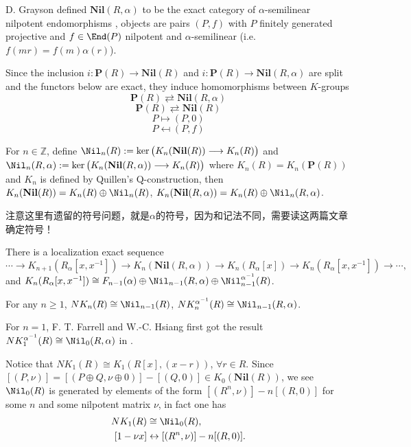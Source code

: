 D. Grayson defined $\mathbf{Nil}(R,\alpha)$ to be the exact category of $\alpha$-semilinear nilpotent endomorphisms \cite{MR89i:16021}, objects are pairs $(P,f)$ with $P$ finitely generated projective and $f\in \End(P)$ nilpotent and $\alpha$-semilinear (i.e.\ $f(mr)=f(m)\alpha(r)$).

Since the inclusion $i \colon \mathbf{P}(R)  \longrightarrow \mathbf{Nil}(R)$ and $i \colon \mathbf{P}(R)  \longrightarrow \mathbf{Nil}(R,\alpha)$ are split and the functors below are exact, they induce homomorphisms between $K$-groups
\[\mathbf{P}(R)  \rightleftarrows \mathbf{Nil}(R,\alpha)\]
\[\mathbf{P}(R)  \rightleftarrows \mathbf{Nil}(R)\]
\[P \mapsto (P,0)\]
\[P \mapsfrom (P,f)\]
\begin{definition}
	For $n\in \mathbb{Z}$, define $\Nil_n(R):= \ker\big(K_n(\mathbf{Nil}(R))\longrightarrow K_n(R)\big)$ and $\Nil_n(R,\alpha):= \ker\big(K_n(\mathbf{Nil}(R,\alpha))\longrightarrow K_n(R)\big)$ where $K_n(R)=K_n(\mathbf{P}(R))$ and $K_n$ is defined by Quillen's Q-construction, then $K_n(\mathbf{Nil}(R))=K_n(R) \oplus \Nil_n(R)$, $K_n(\mathbf{Nil}(R,\alpha))=K_n(R) \oplus \Nil_n(R,\alpha)$.
\end{definition}
{\color{red}注意这里有遗留的符号问题，就是$\alpha$的符号，因为\cite{MR41:5457}和\cite{MR89i:16021}记法不同，需要读这两篇文章确定符号！}
\begin{theorem}[\cite{MR89i:16021}]
	There is a localization exact sequence
	\[\cdots \longrightarrow K_{n+1}(R_{\alpha}[x,x^{-1}]) \longrightarrow K_n(\mathbf{Nil}(R,\alpha)) \longrightarrow K_n(R_{\alpha}[x])\longrightarrow K_{n}(R_{\alpha}[x,x^{-1}]) \longrightarrow \cdots,\]
	and $K_n(R_{\alpha}[x,x^{-1}]) \cong F_{n-1}(\alpha) \oplus \Nil_{n-1}(R,\alpha) \oplus \Nil_{n-1}^{\alpha^{-1}}(R)$.
\end{theorem}
\begin{prop}
	For any $n\geq 1$, $NK_n(R)\cong \Nil_{n-1}(R)$, $NK_n^{\alpha^{-1}}(R)\cong \Nil_{n-1}(R,\alpha)$.
\end{prop}
For $n=1$, F. T. Farrell and W.-C. Hsiang first got the result $NK_1^{\alpha^{-1}}(R)\cong \Nil_{0}(R,\alpha)$ in \cite{MR41:5457}.

Notice that $NK_1(R)\cong K_1(R[x],(x-r))$, $\forall r\in R$.
Since $[(P,\nu)]=[(P\oplus Q,\nu\oplus 0)]-[(Q,0)]\in K_0(\mathbf{Nil}(R))$, we see $\Nil_0(R)$ is generated by elements of the form $[(R^n,\nu)]-n[(R,0)]$ for some $n$ and some nilpotent matrix $\nu$, in fact one has
\begin{align*}
	NK_1(R) & \cong \Nil_0(R),\\
[1-\nu x] & \leftrightarrow [(R^n,\nu)]-n[(R,0)].
\end{align*}

